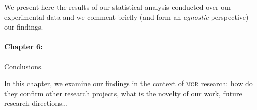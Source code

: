We present here the results of our statistical analysis conducted over our experimental data and we comment briefly (and form an {\it agnostic} perspective) our findings.

\paragraph{Chapter 6:} Conclusions.

In this chapter, we examine our findings in the context of \textsc{mgr} research: how do they confirm other research projects, what is the novelty of our work, future research directions...






